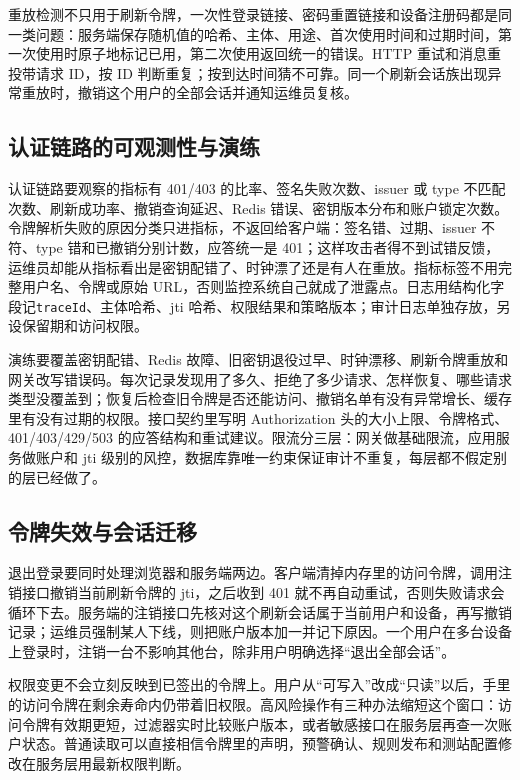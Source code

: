 重放检测不只用于刷新令牌，一次性登录链接、密码重置链接和设备注册码都是同一类问题：服务端保存随机值的哈希、主体、用途、首次使用时间和过期时间，第一次使用时原子地标记已用，第二次使用返回统一的错误。HTTP 重试和消息重投带请求 ID，按 ID 判断重复；按到达时间猜不可靠。同一个刷新会话族出现异常重放时，撤销这个用户的全部会话并通知运维员复核。

\subsection{认证链路的可观测性与演练}

认证链路要观察的指标有 401/403 的比率、签名失败次数、issuer 或 type 不匹配次数、刷新成功率、撤销查询延迟、Redis 错误、密钥版本分布和账户锁定次数。令牌解析失败的原因分类只进指标，不返回给客户端：签名错、过期、issuer 不符、type 错和已撤销分别计数，应答统一是 401；这样攻击者得不到试错反馈，运维员却能从指标看出是密钥配错了、时钟漂了还是有人在重放。指标标签不用完整用户名、令牌或原始 URL，否则监控系统自己就成了泄露点。日志用结构化字段记\texttt{traceId}、主体哈希、jti 哈希、权限结果和策略版本；审计日志单独存放，另设保留期和访问权限。

演练要覆盖密钥配错、Redis 故障、旧密钥退役过早、时钟漂移、刷新令牌重放和网关改写错误码。每次记录发现用了多久、拒绝了多少请求、怎样恢复、哪些请求类型没覆盖到；恢复后检查旧令牌是否还能访问、撤销名单有没有异常增长、缓存里有没有过期的权限。接口契约里写明 Authorization 头的大小上限、令牌格式、401/403/429/503 的应答结构和重试建议。限流分三层：网关做基础限流，应用服务做账户和 jti 级别的风控，数据库靠唯一约束保证审计不重复，每层都不假定别的层已经做了。

\subsection{令牌失效与会话迁移}

退出登录要同时处理浏览器和服务端两边。客户端清掉内存里的访问令牌，调用注销接口撤销当前刷新令牌的 jti，之后收到 401 就不再自动重试，否则失败请求会循环下去。服务端的注销接口先核对这个刷新会话属于当前用户和设备，再写撤销记录；运维员强制某人下线，则把账户版本加一并记下原因。一个用户在多台设备上登录时，注销一台不影响其他台，除非用户明确选择“退出全部会话”。

权限变更不会立刻反映到已签出的令牌上。用户从“可写入”改成“只读”以后，手里的访问令牌在剩余寿命内仍带着旧权限。高风险操作有三种办法缩短这个窗口：访问令牌有效期更短，过滤器实时比较账户版本，或者敏感接口在服务层再查一次账户状态。普通读取可以直接相信令牌里的声明，预警确认、规则发布和测站配置修改在服务层用最新权限判断。

